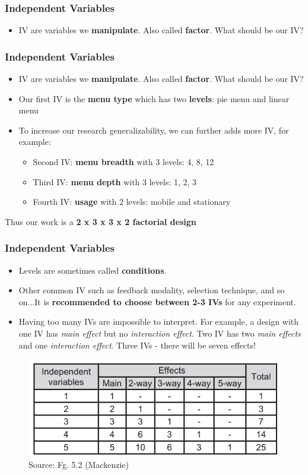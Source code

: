 \documentclass{beamer}
\begin{document}
\begin{frame}
\frametitle{Independent Variables}
\begin{itemize}
	\item IV are variables we \textbf{manipulate}.  Also called \textbf{factor}. What should be our IV? 
\end{itemize}
\end{frame}

\begin{frame}
\frametitle{Independent Variables}
\begin{itemize}
	\item IV are variables we \textbf{manipulate}.  Also called \textbf{factor}.  What should be our IV?
\end{itemize}
\begin{itemize}
	\item Our first IV is the \textbf{menu type} which has two \textbf{levels}: pie menu and linear menu
	\item To increase our research generalizability, we can further adds more IV, for example:
	\begin{itemize}
		\item Second IV: \textbf{menu breadth} with 3 levels: 4, 8, 12
		\item Third IV: \textbf{menu depth} with 3 levels: 1, 2, 3
		\item Fourth IV: \textbf{usage} with 2 levels: mobile and stationary
	\end{itemize}
\end{itemize}
Thus our work is a \textbf{2 x 3 x 3 x 2 factorial design}
\end{frame}

\begin{frame}
\frametitle{Independent Variables}
\begin{itemize}
	\item Levels are sometimes called \textbf{conditions}.
	\item Other common IV such as feedback modality, selection technique, and so on...It is \textbf{recommended to choose between 2-3 IVs} for any experiment.
	\item Having too many IVs are impossible to interpret.  For example, a design with one IV has \textit{main effect} but no \textit{interaction effect}.  Two IV has two \textit{main effects} and one \textit{interaction effect}.  Three IVs - there will be seven effects!
\end{itemize}
	\begin{figure}
		\includegraphics[width=0.5\linewidth]{effect}
		\caption{Source: Fg. 5.2 (Mackenzie)}
	\end{figure}
\end{frame}
\end{document}
